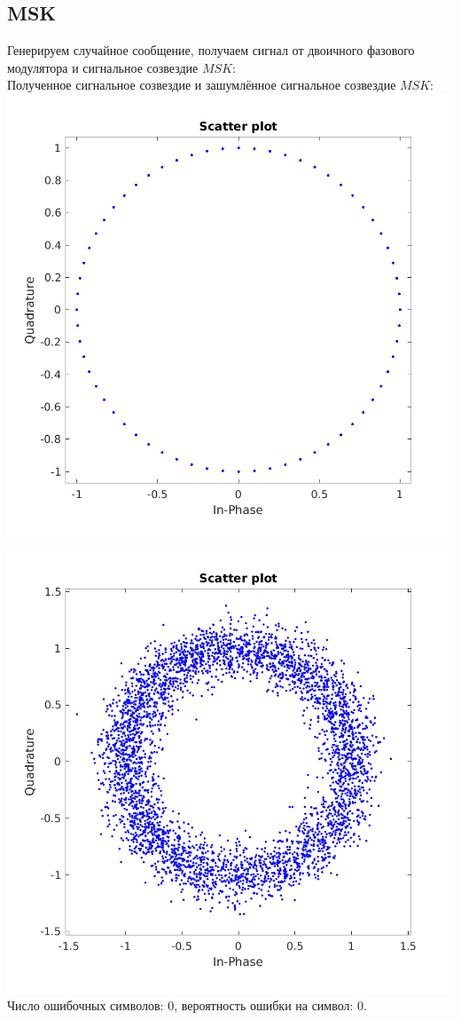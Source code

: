 \documentclass[a4paper]{article}
\begin{document}
\subsection{MSK}
Генерируем случайное сообщение, получаем сигнал от двоичного фазового модулятора и сигнальное созвездие $MSK$:
\\
Полученное сигнальное созвездие и зашумлённое сигнальное созвездие $MSK$:\\
\includegraphics[scale=0.4]{lab6/figures/figure_8.png}
\includegraphics[scale=0.4]{lab6/figures/figure_9.png}\\
Число ошибочных символов: 0, вероятность ошибки на символ: 0.
\end{document}
